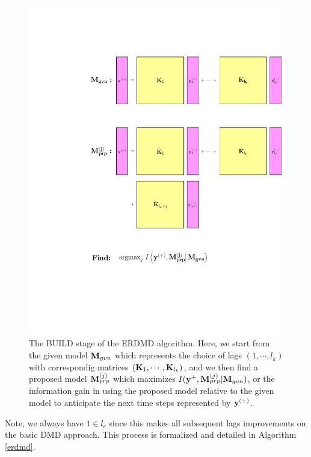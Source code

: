 \documentclass[a4paper,11pt]{article}
\begin{document}
\begin{figure}
\centering
\includegraphics[scale=.75]{square_games}
\caption{The BUILD stage of the ERDMD algorithm.  Here, we start from the given model ${\bf M}_{gvn}$ which represents the choice of lags $(1, \cdots, l_{k})$ with correspondig matrices $({\bf K}_{1}, \cdots, {\bf K}_{l_{k}})$, and we then find a proposed model ${\bf M}^{(j)}_{prp}$ which maximizes $I({\bf y}^{+}, {\bf M}^{(j)}_{prp}|{\bf M}_{gvn})$, or the information gain in using the proposed model relative to the given model to anticipate the next time steps represented by ${\bf y}^{(+)}$.}  
\label{fig:build_stage}
\end{figure}
Note, we always have $1\in l_{c}$ since this makes all subsequent lags improvements on the basic DMD approach.  This process is formalized and detailed in Algorithm \ref{erdmd}.  
\end{document}
